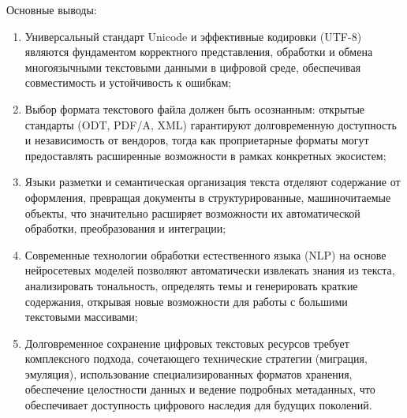 \documentclass{SibFU-docs}
\begin{document}
Основные выводы:
\begin{enumerate}
\item Универсальный стандарт Unicode и эффективные кодировки (UTF-8) являются фундаментом корректного представления, обработки и обмена многоязычными текстовыми данными в цифровой среде, обеспечивая совместимость и устойчивость к ошибкам;
\item Выбор формата текстового файла должен быть осознанным: открытые стандарты (ODT, PDF/A, XML) гарантируют долговременную доступность и независимость от вендоров, тогда как проприетарные форматы могут предоставлять расширенные возможности в рамках конкретных экосистем;
\item Языки разметки и семантическая организация текста отделяют содержание от оформления, превращая документы в структурированные, машиночитаемые объекты, что значительно расширяет возможности их автоматической обработки, преобразования и интеграции;
\item Современные технологии обработки естественного языка (NLP) на основе нейросетевых моделей позволяют автоматически извлекать знания из текста, анализировать тональность, определять темы и генерировать краткие содержания, открывая новые возможности для работы с большими текстовыми массивами;
\item Долговременное сохранение цифровых текстовых ресурсов требует комплексного подхода, сочетающего технические стратегии (миграция, эмуляция), использование специализированных форматов хранения, обеспечение целостности данных и ведение подробных метаданных, что обеспечивает доступность цифрового наследия для будущих поколений.
\end{enumerate}

\vspace{1em}
\end{document}
